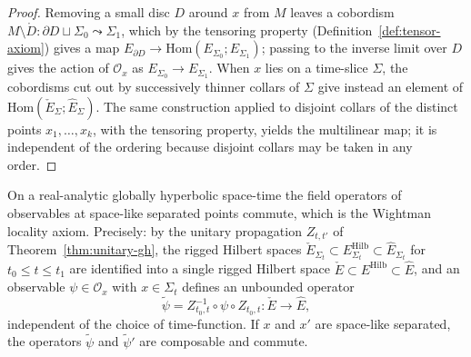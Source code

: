 \begin{proof}
  Removing a small disc $D$ around $x$ from $M$ leaves a cobordism
  $M \setminus \mathring D \colon \partial D \sqcup \Sigma_0 \leadsto \Sigma_1$, which by
  the tensoring property (Definition~\ref{def:tensor-axiom}) gives a map
  $E_{\partial D} \to \mathrm{Hom}(E_{\Sigma_0}; E_{\Sigma_1})$; passing to the inverse
  limit over $D$ gives the action of $\mathcal O_x$ as $E_{\Sigma_0} \to E_{\Sigma_1}$.
  When $x$ lies on a time-slice $\Sigma$, the cobordisms cut out by successively thinner
  collars of $\Sigma$ give instead an element of
  $\mathrm{Hom}(\check E_{\Sigma}; \hat E_{\Sigma})$. The same construction applied to
  disjoint collars of the distinct points $x_1, \ldots, x_k$, with the tensoring
  property, yields the multilinear map; it is independent of the ordering because
  disjoint collars may be taken in any order.
\end{proof}

\begin{proposition}
  \label{prop:spacelike-commutativity}
  \leanok
  On a real-analytic globally hyperbolic space-time the field operators of observables
  at space-like separated points commute, which is the Wightman locality axiom.
  Precisely: by the unitary propagation $Z_{t,t'}$ of Theorem~\ref{thm:unitary-gh}, the
  rigged Hilbert spaces $\check E_{\Sigma_t} \subset E_{\Sigma_t}^{\mathrm{Hilb}} \subset
  \hat E_{\Sigma_t}$ for $t_0 \le t \le t_1$ are identified into a single rigged Hilbert
  space $\check E \subset E^{\mathrm{Hilb}} \subset \hat E$, and an observable
  $\psi \in \mathcal O_x$ with $x \in \Sigma_t$ defines an unbounded operator
  \[ \tilde\psi = Z_{t_0,t}^{-1} \circ \psi \circ Z_{t_0,t} \colon \check E \to \hat E, \]
  independent of the choice of time-function. If $x$ and $x'$ are space-like separated,
  the operators $\tilde\psi$ and $\tilde\psi'$ are composable and commute.
\end{proposition}

